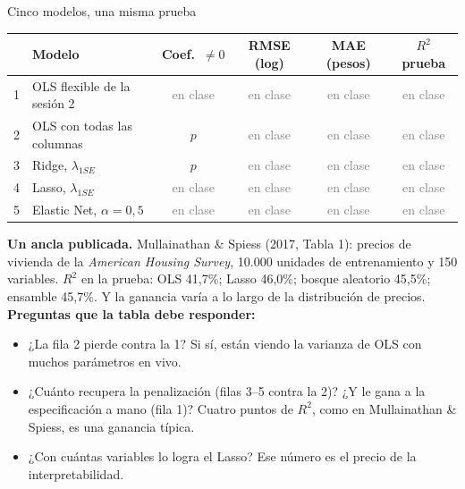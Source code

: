 \documentclass{beamer}
\newcommand{\1}{\mathbb{I}}
\begin{document}
\begin{frame}{Cinco modelos, una misma prueba}
\small
\begin{center}
\scriptsize
\setlength{\tabcolsep}{4pt}
\renewcommand{\arraystretch}{1.2}
\begin{tabular}{llcccc}
\hline
 & Modelo & Coef.\ $\neq 0$ & RMSE (log) & MAE (pesos) & $R^2$ prueba \\
\hline
1 & OLS flexible de la sesión 2 & \textcolor{gray}{en clase} & \textcolor{gray}{en clase} & \textcolor{gray}{en clase} & \textcolor{gray}{en clase} \\
2 & OLS con todas las columnas & $p$ & \textcolor{gray}{en clase} & \textcolor{gray}{en clase} & \textcolor{gray}{en clase} \\
3 & Ridge, $\lambda_{1SE}$ & $p$ & \textcolor{gray}{en clase} & \textcolor{gray}{en clase} & \textcolor{gray}{en clase} \\
4 & Lasso, $\lambda_{1SE}$ & \textcolor{gray}{en clase} & \textcolor{gray}{en clase} & \textcolor{gray}{en clase} & \textcolor{gray}{en clase} \\
5 & Elastic Net, $\alpha = 0{,}5$ & \textcolor{gray}{en clase} & \textcolor{gray}{en clase} & \textcolor{gray}{en clase} & \textcolor{gray}{en clase} \\
\hline
\end{tabular}
\end{center}
\pause
\textbf{Un ancla publicada.} Mullainathan \& Spiess (2017, Tabla 1): precios de vivienda de la \emph{American Housing Survey}, 10.000 unidades de entrenamiento y 150 variables. $R^2$ en la prueba: OLS 41,7\%; Lasso 46,0\%; bosque aleatorio 45,5\%; ensamble 45,7\%. Y la ganancia varía a lo largo de la distribución de precios.
\pause
\vspace{0.05cm}
\textbf{Preguntas que la tabla debe responder:}
\begin{itemize}\itemsep2pt
  \item ¿La fila 2 pierde contra la 1? Si sí, están viendo la varianza de OLS con muchos parámetros en vivo.
  \item ¿Cuánto recupera la penalización (filas 3--5 contra la 2)? ¿Y le gana a la especificación a mano (fila 1)? Cuatro puntos de $R^2$, como en Mullainathan \& Spiess, es una ganancia típica.
  \item ¿Con cuántas variables lo logra el Lasso? Ese número es el precio de la interpretabilidad.
\end{itemize}
\end{frame}
\end{document}
